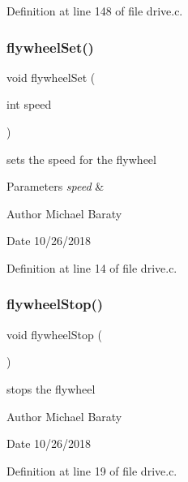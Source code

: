 Definition at line 148 of file drive.\+c.

\mbox{\label{drive_8c_a60e483906879d9558762282b5d5b581b}} 
\subsubsection{flywheel\+Set()}
{\footnotesize\ttfamily void flywheel\+Set (\begin{DoxyParamCaption}\item[{int}]{speed }\end{DoxyParamCaption})}



sets the speed for the flywheel 


\begin{DoxyParams}{Parameters}
{\em speed} & \\
\hline
\end{DoxyParams}
\begin{DoxyAuthor}{Author}
Michael Baraty 
\end{DoxyAuthor}
\begin{DoxyDate}{Date}
10/26/2018 
\end{DoxyDate}


Definition at line 14 of file drive.\+c.

\mbox{\label{drive_8c_a6889fbcc0c9811401a9339e1bafbf467}} 
\subsubsection{flywheel\+Stop()}
{\footnotesize\ttfamily void flywheel\+Stop (\begin{DoxyParamCaption}{ }\end{DoxyParamCaption})}



stops the flywheel 

\begin{DoxyAuthor}{Author}
Michael Baraty 
\end{DoxyAuthor}
\begin{DoxyDate}{Date}
10/26/2018 
\end{DoxyDate}


Definition at line 19 of file drive.\+c.

\mbox{\label{drive_8c_a80d5e8b6ad5f4ebc5e22d2c179537aa8}} 
